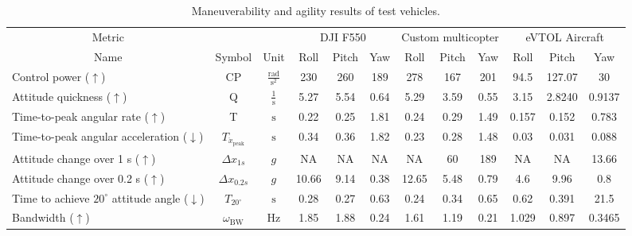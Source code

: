 \begin{table}
\centering
\caption{Maneuverability and agility results of test vehicles.}
\label{tab:maneuverability}
\begin{tabular}{lcccccccccccc}
\hline
\multicolumn{2}{c}{Metric} & & & \multicolumn{3}{c}{DJI F550} & \multicolumn{3}{c}{Custom multicopter \cite{Verbeke}}  & \multicolumn{3}{c}{eVTOL Aircraft}\\
\cline{5-7} \cline{8-10}  \cline{11-13}
\multicolumn{2}{c}{Name} & Symbol & Unit                                                           & Roll  & Pitch& Yaw  & Roll  &Pitch & Yaw   & Roll  & Pitch & Yaw \\
\hline
\multicolumn{2}{l}{Control power ($\uparrow$)} & CP & $\frac{\text{rad}}{\text{s}^2}$              & 230   & 260  & 189  & 278   & 167  & 201   & 94.5  & 127.07    & 30\\
\multicolumn{2}{l}{Attitude quickness ($\uparrow$)} & Q & $\frac{1}{\text{s}}$                     & 5.27  & 5.54 & 0.64 & 5.29  & 3.59 & 0.55  & 3.15  & 2.8240    & 0.9137\\
\multicolumn{2}{l}{Time-to-peak angular rate ($\uparrow$)} & T & $\text{s}$                        & 0.22  & 0.25 & 1.81 & 0.24  & 0.29 & 1.49  & 0.157 & 0.152     & 0.783\\
\multicolumn{2}{l}{Time-to-peak angular acceleration ($\downarrow$)}   
& $T_{\ddot{x}_{\text{peak}}}$ & $\text{s}$                                                        & 0.34  & 0.36 & 1.82 & 0.23  & 0.28 & 1.48  & 0.03  & 0.031     & 0.088\\
\multicolumn{2}{l}{Attitude change over 1 s ($\uparrow$)} & $\Delta x_{1s}$ & $g$                  & NA    & NA   & NA   & NA    & 60   & 189   & NA    & NA        & 13.66\\
\multicolumn{2}{l}{Attitude change over 0.2 s ($\uparrow$)} & $\Delta x_{0.2s}$ & $g$              & 10.66 & 9.14 & 0.38 & 12.65 & 5.48 & 0.79  & 4.6	& 9.96        & 0.8\\
\multicolumn{2}{l}{Time to achieve $20^{\circ}$ attitude angle ($\downarrow$)} 
& $T_{20^{\circ}}$ & $\text{s}$                                                                    & 0.28  & 0.27 & 0.63 & 0.24  & 0.34 & 0.65  & 0.62 	& 0.391    & 21.5\\
\multicolumn{2}{l}{Bandwidth ($\uparrow$)} & $\omega_{\text{BW}}$ & $\text{Hz}$                    & 1.85  & 1.88 & 0.24 & 1.61  & 1.19 & 0.21  & 1.029 & 0.897     & 0.3465\\
\hline
\end{tabular}
\end{table}


